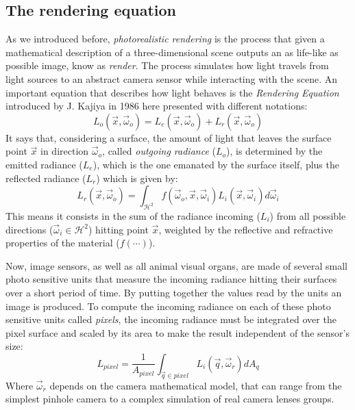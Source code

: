 \subsection{The rendering equation}
\label{secrendeq}
As we introduced before, \textit{photorealistic rendering} is the process that given a mathematical description of a three-dimensional scene outputs an as life-like as possible image, know as \textit{render}. The process simulates how light travels from light sources to an abstract camera sensor while interacting with the scene. An important equation that describes how light behaves is the \textit{Rendering Equation} introduced by J. Kajiya in 1986 \cite{kajiya1986rendering} here presented with different notations:
\begin{equation}
	L_o(\vec{x},\vec{\omega}_o) = 
		L_e(\vec{x},\vec{\omega}_o) + 
		L_r(\vec{x},\vec{\omega}_o)
	\label{rendeqeasy}
\end{equation}
It says that, considering a surface, the amount of light that leaves the surface point $\vec{x}$ in direction $\vec{\omega}_o$, called \textit{outgoing radiance} ($L_o$), is determined by the emitted radiance ($L_e$), which is the one emanated by the surface itself, plus the reflected radiance ($L_r$) which is given by:
\begin{equation}
	L_r(\vec{x},\vec{\omega}_o) = 
		\int_{\mathcal{H}^2} 
			f(\vec{\omega}_o, \vec{x}, \vec{\omega}_i)
			L_i(\vec{x},\vec{\omega}_i)
			d\vec{\omega}_i
	\label{reflectioneq}
\end{equation}
This means it consists in the sum of the radiance incoming ($L_i$) from all possible directions ($\vec{\omega}_i \in \mathcal{H}^2$) hitting point $\vec{x}$, weighted by the reflective and refractive properties of the material ($f(\cdots)$).

Now, image sensors, as well as all animal visual organs, are made of several small photo sensitive units that measure the incoming radiance hitting their surfaces over a short period of time. By putting together the values read by the units an image is produced. To compute the incoming radiance on each of these photo sensitive units called \textit{pixels}, the incoming radiance must be integrated over the pixel surface and scaled by its area to make the result independent of the sensor's size:
\begin{equation}
	L_{pixel} = \frac{1}{A_{pixel}} 
		\int_{\vec{q}\in pixel} L_i(\vec{q}, \vec{\omega}_r)dA_q
	\label{pixelradiance}
\end{equation}
Where $\vec{\omega}_r$ depends on the camera mathematical model, that can range from the simplest pinhole camera to a complex simulation of real camera lenses groups.

